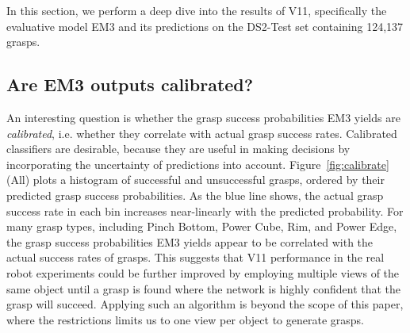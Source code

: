
\noindent
In this section, we perform a deep dive into the results of V11, specifically the evaluative model EM3 and its predictions on the DS2-Test set containing 124,137 grasps. 

\subsection{Are EM3 outputs calibrated?}
\noindent

An interesting question is whether the grasp success probabilities EM3 yields are \textit{calibrated}, i.e. whether they correlate with actual grasp success rates. Calibrated classifiers are desirable, because they are useful in making decisions by incorporating the uncertainty of predictions into account. Figure~\ref{fig:calibrate}(All) plots a histogram of successful and unsuccessful grasps, ordered by their predicted grasp success probabilities. As the blue line shows, the actual grasp success rate in each bin increases near-linearly with the predicted probability. For many grasp types, including Pinch Bottom, Power Cube, Rim, and Power Edge, the grasp success probabilities EM3 yields appear to be correlated with the actual success rates of grasps. This suggests that V11 performance in the real robot experiments could be further improved by employing multiple views of the same object until a grasp is found where the network is highly confident that the grasp will succeed. Applying such an algorithm is beyond the scope of this paper, where the restrictions limits us to one view per object to generate grasps.

